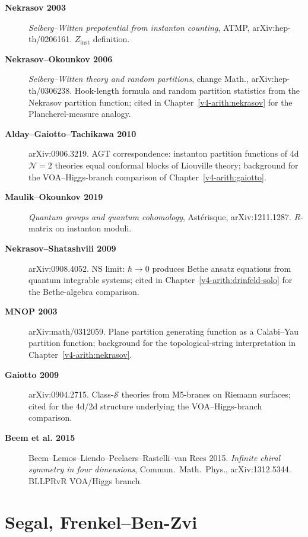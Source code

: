 \begin{description}
\item[\textbf{Nekrasov 2003}] \emph{Seiberg--Witten prepotential from
instanton counting}, ATMP, arXiv:hep-th/0206161. \(Z_{\mathrm{inst}}\)
definition.
\item[\textbf{Nekrasov--Okounkov 2006}] \emph{Seiberg--Witten theory
and random partitions}, change Math., arXiv:hep-th/0306238.
Hook-length formula and random partition statistics from
the Nekrasov partition function; cited in
Chapter~\ref{v4-arith:nekrasov} for the Plancherel-measure
analogy.
\item[\textbf{Alday--Gaiotto--Tachikawa 2010}] arXiv:0906.3219.
AGT correspondence: instanton partition functions of 4d
\(\mathcal{N}=2\) theories equal conformal blocks of Liouville
theory; background for the VOA--Higgs-branch comparison of
Chapter~\ref{v4-arith:gaiotto}.
\item[\textbf{Maulik--Okounkov 2019}] \emph{Quantum groups and
quantum cohomology}, Ast\'erisque, arXiv:1211.1287. \(R\)-matrix on
instanton moduli.
\item[\textbf{Nekrasov--Shatashvili 2009}] arXiv:0908.4052. NS
limit: \(\hbar\to 0\) produces Bethe ansatz equations from
quantum integrable systems; cited in
Chapter~\ref{v4-arith:drinfeld-solo} for the Bethe-algebra comparison.
\item[\textbf{MNOP 2003}] arXiv:math/0312059. Plane partition
generating function as a Calabi--Yau partition function; background
for the topological-string interpretation in
Chapter~\ref{v4-arith:nekrasov}.
\item[\textbf{Gaiotto 2009}] arXiv:0904.2715. Class-\(\mathcal{S}\)
theories from M5-branes on Riemann surfaces; cited for the
4d/2d structure underlying the VOA--Higgs-branch comparison.
\item[\textbf{Beem et al. 2015}] Beem--Lemos--Liendo--Peelaers--Rastelli--van Rees 2015. 
\emph{Infinite chiral symmetry in four dimensions},
Commun.~Math.~Phys., arXiv:1312.5344. BLLPRvR VOA/Higgs branch.
\end{description}

\section{Segal, Frenkel--Ben-Zvi}
\label{v4-arith:app:A:segal-fbz}

